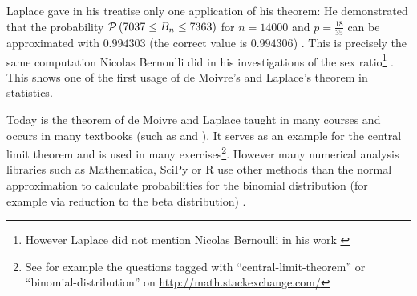 Laplace gave in his treatise only one application of his theorem: He demonstrated that the probability $\mathcal P\left({7037 \le B_{n} \le 7363}\right)$ for $n=14000$ and $p=\frac{18}{35}$ can be approximated with $0.994303$ (the correct value is $0.994306$) \cite[.497]{hald1}\cite[p. 25]{hald2}. This is precisely the same computation Nicolas Bernoulli did in his investigations of the sex ratio\footnote{However Laplace did not mention Nicolas Bernoulli in his work \cite[p. 25]{hald2}} \cite[p. 25]{hald2}. This shows one of the first usage of de Moivre's and Laplace's theorem in statistics.

Today is the theorem of de Moivre and Laplace taught in many courses and occurs in many textbooks (such as \cite[pp. 64-67]{irle} and \cite[pp. 131-134]{georgii}). It serves as an example for the central limit theorem and is used in many exercises\footnote{See for example the questions tagged with ``central-limit-theorem'' or ``binomial-distribution'' on \url{http://math.stackexchange.com/}}. However many numerical analysis libraries such as Mathematica, SciPy or R use other methods than the normal approximation to calculate probabilities for the binomial distribution (for example via reduction to the beta distribution) \cite{mathematica}\cite{scipy}\cite{r}.
